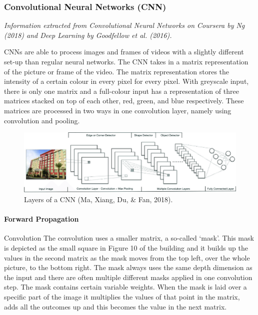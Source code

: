 \subsubsection*{Convolutional Neural Networks (CNN)}
\textit{Information extracted from Convolutional Neural Networks on Coursera by Ng (2018) and Deep Learning by Goodfellow et al. (2016).}

CNNs are able to process images and frames of videos with a slightly different set-up than regular neural networks. The CNN takes in a matrix representation of the picture or frame of the video. The matrix representation stores the intensity of a certain colour in every pixel for every pixel. With greyscale input, there is only one matrix and a full-colour input has a representation of three matrices stacked on top of each other, red, green, and blue respectively. These matrices are processed in two ways in one convolution layer, namely using convolution and pooling. 

\begin{figure}[h]
	\includegraphics[width=\textwidth]{fig10.png} 
	\caption{Layers of a CNN (Ma, Xiang, Du, \& Fan, 2018).}
\end{figure}

\paragraph{Forward Propagation}
Convolution
The convolution uses a smaller matrix, a so-called \lq mask\rq . This mask is depicted as the small square in Figure 10 of the building and it builds up the values in the second matrix as the mask moves from the top left, over the whole picture, to the bottom right. The mask always uses the same depth dimension as the input and there are often multiple different masks applied in one convolution step. The mask contains certain variable weights. When the mask is laid over a specific part of the image it multiplies the values of that point in the matrix, adds all the outcomes up and this becomes the value in the next matrix. 

